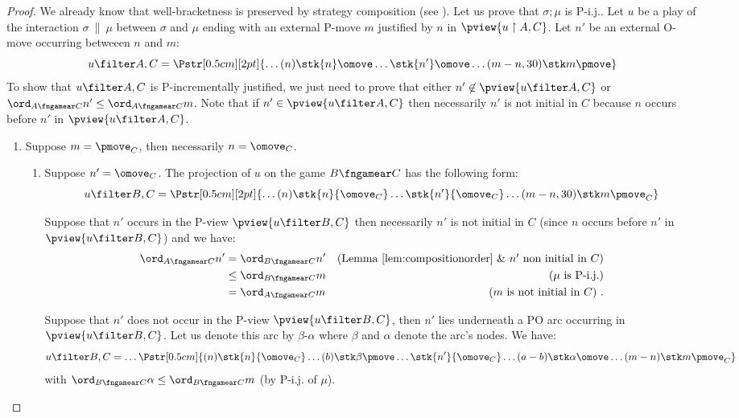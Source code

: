 \begin{proof}
We already know that well-bracketness
is preserved by strategy composition (see \cite[Proposition 2.5]{abramsky94full}).
Let us prove that $\sigma ; \mu$ is P-i.j..
Let $u$ be a play of the interaction $\sigma\ \|\ \mu$ between $\sigma$ and $\mu$
ending with an external P-move $m$
justified by $n$ in $\pview{u \upharpoonright A , C}$.
Let $n'$ be an external O-move occurring betweeen $n$ and $m$:
$$ u \filter A,C =  
\Pstr[0.5cm][2pt]{ \ldots (n){\stk {n} \omove}  \ldots
 {\stk {n'} \omove}  \ldots  (m-n,30){\stk m \pmove}
}
$$
To show that $u \filter A,C$ is P-incrementally justified, we just need to prove that either $n'\not\in \pview{u \filter A,C}$ or $\ord_{A\fngamear C} n' \leq \ord_{A\fngamear C} m$. 
Note that if $n'\in \pview{u \filter A,C}$ 
then necessarily $n'$ is not initial 
in $C$ because $n$ occurs before $n'$ in
$\pview{u \filter A,C}$.

\begin{enumerate}[(1)]
\item \label{case:mC}
Suppose $m =\pmove_C$, then necessarily $n=\omove_C$.

\begin{enumerate}
\item \label{case:mCnpC} Suppose $n' = \omove_C$. The projection of $u$ on the game $B\fngamear C$ has the following form:
$$ u \filter B,C =  
\Pstr[0.5cm][2pt]{ \ldots (n){\stk {n} {\omove_C}}  \ldots
 {\stk {n'}{\omove_C}}  \ldots  (m-n,30){\stk m {\pmove_C}}
}$$

Suppose that $n'$ occurs in the P-view $\pview{u\filter B,C}$ then necessarily $n'$ is not initial 
in $C$ (since $n$ occurs before $n'$ in $\pview{u \filter B,C}$) and we have:
\begin{align*}
\ord_{A\fngamear C} n' 
& = \ord_{B\fngamear C} n' & \mbox{(Lemma \ref{lem:compositionorder} \& $n'$ non initial in $C$)} \\
& \leq \ord_{B\fngamear C} m & \mbox{($\mu$ is P-i.j.)} \\
& = \ord_{A\fngamear C} m & \mbox{($m$ is not initial in $C$)} \ .
\end{align*}

Suppose that $n'$ does not occur in the P-view $\pview{u \filter B,C}$, then $n'$ lies underneath a PO arc occurring in $\pview{u \filter B,C}$. Let us denote this arc by $\beta$-$\alpha$ where $\beta$ and $\alpha$ denote the arc's nodes. We have:
$$ u \filter B,C = \ldots  
\Pstr[0.5cm]{
 (n){\stk{n} {\omove_C} } \ldots (b){\stk\beta \pmove} \ldots \stk{n'} {\omove_C}
\ldots (a-b){\stk\alpha \omove}  \ldots (m-n){\stk m {\pmove_C} }
} $$
with $\ord_{B\fngamear C} \alpha \leq \ord_{B\fngamear C} m$ (by P-i.j. of $\mu$).
  

\end{enumerate}
\end{enumerate}
\end{proof}
